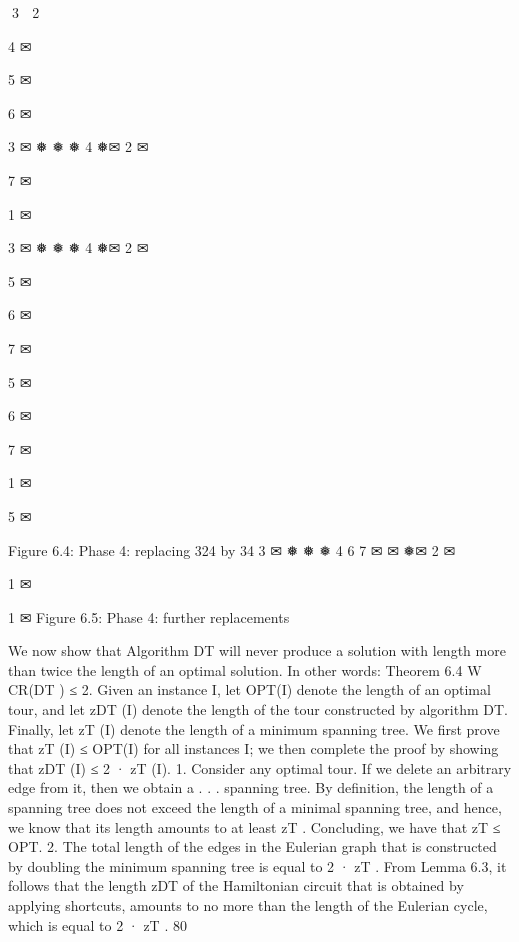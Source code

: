 3 ✉
2 ✉

4
✉

5
✉

6
✉

3 ✉
❅
❅
❅ 4
❅✉
2 ✉

7
✉

1 ✉

3 ✉
❅
❅
❅ 4
❅✉
2 ✉

5
✉

6
✉

7
✉

5
✉

6
✉

7
✉

1 ✉

5
✉

Figure 6.4: Phase 4: replacing 324 by 34
3 ✉
❅
❅
❅ 4
6
7
✉
✉
❅✉
2 ✉

1 ✉

1 ✉
Figure 6.5: Phase 4: further replacements

We now show that Algorithm DT will never produce a solution with length more than twice the length
of an optimal solution. In other words:
Theorem 6.4 W CR(DT ) ≤ 2.
Given an instance I, let OPT(I) denote the length of an optimal tour, and let zDT (I) denote the length
of the tour constructed by algorithm DT. Finally, let zT (I) denote the length of a minimum spanning
tree. We first prove that zT (I) ≤ OPT(I) for all instances I; we then complete the proof by showing
that zDT (I) ≤ 2 · zT (I).
1. Consider any optimal tour. If we delete an arbitrary edge from it, then we obtain a . . . spanning tree.
By definition, the length of a spanning tree does not exceed the length of a minimal spanning tree,
and hence, we know that its length amounts to at least zT . Concluding, we have that zT ≤ OPT.
2. The total length of the edges in the Eulerian graph that is constructed by doubling the minimum
spanning tree is equal to 2 · zT . From Lemma 6.3, it follows that the length zDT of the Hamiltonian
circuit that is obtained by applying shortcuts, amounts to no more than the length of the Eulerian
cycle, which is equal to 2 · zT .
80

